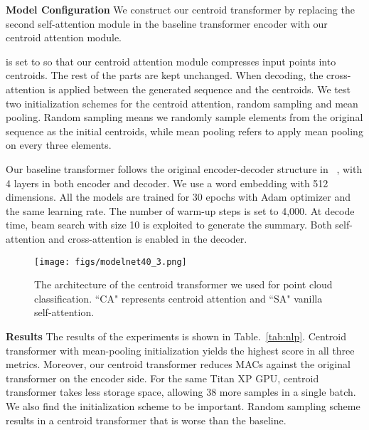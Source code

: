 \documentclass[english]{article}
\begin{document}
\textbf{Model Configuration} \space We construct our centroid transformer by replacing the second self-attention module in the baseline transformer encoder with our centroid attention module.

 is set to  so that
our centroid attention module compresses  input points into  centroids.
The rest of the parts are kept unchanged. When decoding, the cross-attention is applied between the generated sequence and the centroids.
We test two initialization schemes for the centroid attention, random sampling and mean pooling. Random sampling means we randomly sample  elements from the original sequence as the initial centroids, while mean pooling refers to apply mean pooling on every three elements.

Our baseline transformer follows the original encoder-decoder structure in ~\cite{vaswani2017attention}, with 4 layers in both encoder and decoder. We use a word embedding with 512 dimensions. All the models are trained for 30 epochs with Adam optimizer and the same learning rate. The number of warm-up steps is set to 4,000. At decode time, beam search with size 10 is exploited to generate the summary. Both self-attention and cross-attention is enabled in the decoder.


\begin{figure}[ht]
    \centering
    \texttt{[image: figs/modelnet40\_3.png]}
    \vspace{-0.5em}
    \caption{The architecture of the centroid transformer we used for point cloud classification. ``CA" represents centroid attention  and ``SA"   vanilla self-attention. }\label{fig:modelnet40}
    

\end{figure}

\textbf{Results} \space The results of the experiments is shown in Table.~\ref{tab:nlp}. Centroid transformer with mean-pooling initialization yields the highest score in all three metrics. Moreover, our centroid transformer reduces  MACs against the original transformer on the encoder side. For the same Titan XP GPU, centroid transformer takes less storage space, allowing 38 more samples in a single batch. We also find the initialization scheme to be important. Random sampling scheme results in a centroid transformer that is worse than the baseline.
\end{document}
